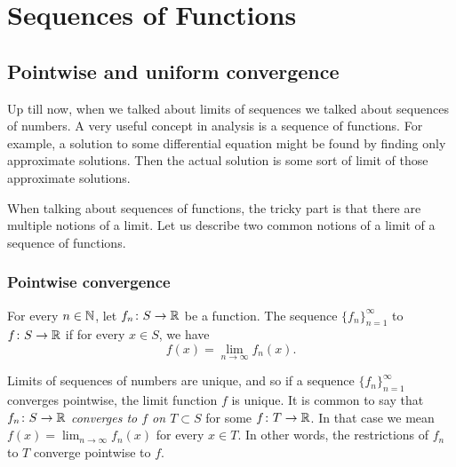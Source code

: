 \chapter{Sequences of Functions} \label{fs:chapter}


\section{Pointwise and uniform convergence}
\label{sec:puconv}


Up till now, when we talked about limits of sequences we talked about
sequences of numbers.
A very useful concept in analysis is a sequence of functions.
For example, a solution to some differential equation
might be found by finding only approximate solutions.
Then the actual solution is some sort of limit of those approximate solutions.

When talking about sequences of functions, the 
tricky part is that there are multiple notions of a limit.
Let us describe two common
notions of a limit of a sequence of functions.

\subsection{Pointwise convergence}

\begin{defn}
For every $n \in {\mathbb{N}}$,
let $f_n \colon S \to {\mathbb{R}}$ be a function.  The sequence
$\{ f_n \}_{n=1}^\infty$
\emph{} to $f \colon S \to {\mathbb{R}}$ if for every $x
\in S$,
we have
\begin{equation*}
f(x) =
\lim_{n\to\infty} f_n(x) .
\end{equation*}
\end{defn}

Limits of sequences of numbers are unique, and so if a sequence
$\{ f_n \}_{n=1}^\infty$
converges pointwise, the limit function $f$ is unique.
It is common to say that $f_n \colon S \to {\mathbb{R}}$
\emph{converges to $f$ on $T \subset S$}
for some $f \colon T \to {\mathbb{R}}$.  In that case we mean 
$f(x) = \lim_{n\to\infty} f_n(x)$ for every $x \in T$.  In other words, the
restrictions of $f_n$ to $T$ converge pointwise to $f$.


